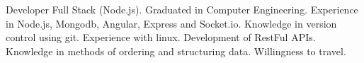 \begin{cvletter}
    Developer Full Stack (Node.js). Graduated in Computer Engineering. 
    Experience in Node.js, Mongodb, Angular, Express and Socket.io. 
    Knowledge in version control using git. Experience with linux. Development of RestFul APIs. 
    Knowledge in methods of ordering and structuring data. Willingness to travel.
\end{cvletter}
